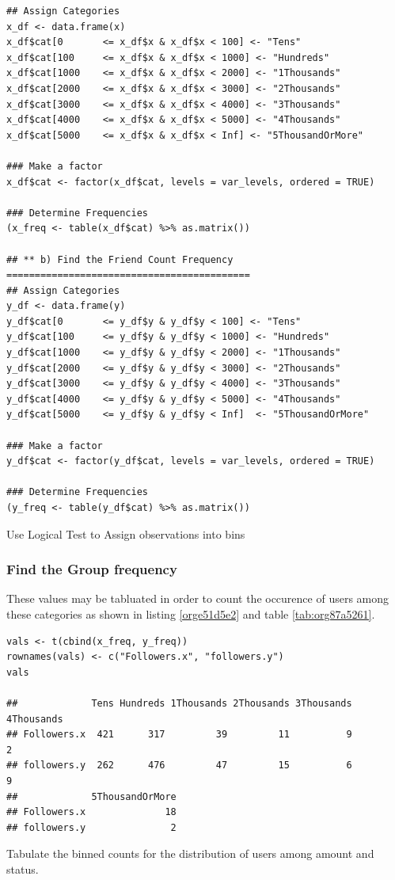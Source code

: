 \documentclass[11pt]{article}
\begin{document}
\begin{listing}[htbp]
\begin{verbatim}
## Assign Categories
x_df <- data.frame(x)
x_df$cat[0       <= x_df$x & x_df$x < 100] <- "Tens"
x_df$cat[100     <= x_df$x & x_df$x < 1000] <- "Hundreds"
x_df$cat[1000    <= x_df$x & x_df$x < 2000] <- "1Thousands"
x_df$cat[2000    <= x_df$x & x_df$x < 3000] <- "2Thousands"
x_df$cat[3000    <= x_df$x & x_df$x < 4000] <- "3Thousands"
x_df$cat[4000    <= x_df$x & x_df$x < 5000] <- "4Thousands"
x_df$cat[5000    <= x_df$x & x_df$x < Inf] <- "5ThousandOrMore"

### Make a factor
x_df$cat <- factor(x_df$cat, levels = var_levels, ordered = TRUE)

### Determine Frequencies
(x_freq <- table(x_df$cat) %>% as.matrix())

## ** b) Find the Friend Count Frequency ===========================================
## Assign Categories
y_df <- data.frame(y)
y_df$cat[0       <= y_df$y & y_df$y < 100] <- "Tens"
y_df$cat[100     <= y_df$y & y_df$y < 1000] <- "Hundreds"
y_df$cat[1000    <= y_df$y & y_df$y < 2000] <- "1Thousands"
y_df$cat[2000    <= y_df$y & y_df$y < 3000] <- "2Thousands"
y_df$cat[3000    <= y_df$y & y_df$y < 4000] <- "3Thousands"
y_df$cat[4000    <= y_df$y & y_df$y < 5000] <- "4Thousands"
y_df$cat[5000    <= y_df$y & y_df$y < Inf]  <- "5ThousandOrMore"

### Make a factor
y_df$cat <- factor(y_df$cat, levels = var_levels, ordered = TRUE)

### Determine Frequencies
(y_freq <- table(y_df$cat) %>% as.matrix())
\end{verbatim}
\caption{\label{orge626d64}Use Logical Test to Assign observations into bins}
\end{listing}

\subsubsection{Find the Group frequency}
\label{sec:orge95e3bf}
These values may be tabluated in order to count the occurence of users among these categories as shown in listing \ref{orge51d5e2} and table \ref{tab:org87a5261}.

\begin{listing}[htbp]
\begin{verbatim}
vals <- t(cbind(x_freq, y_freq))
rownames(vals) <- c("Followers.x", "followers.y")
vals

##             Tens Hundreds 1Thousands 2Thousands 3Thousands 4Thousands
## Followers.x  421      317         39         11          9          2
## followers.y  262      476         47         15          6          9
##             5ThousandOrMore
## Followers.x              18
## followers.y               2
\end{verbatim}
\caption{\label{orge51d5e2}Tabulate the binned counts for the distribution of users among amount and status.}
\end{listing}
\end{document}
